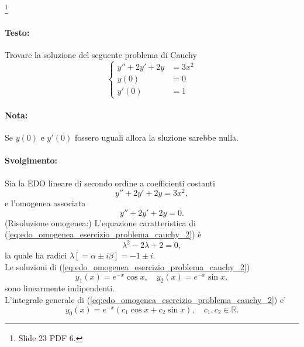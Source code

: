 \begin{example}\footnote{Slide 23 PDF 6.}
	\paragraph{Testo:} Trovare la soluzione del seguente problema di Cauchy
	\begin{equation*}
		\begin{cases}
			y'' + 2y' + 2y &= 3x^2\\
			y(0) &= 0\\
			y'(0)&=1 
		\end{cases}
	\end{equation*}
	\paragraph{Nota:} Se $y(0)$ e $y'(0)$ fossero uguali allora la sluzione sarebbe nulla.
	\paragraph{Svolgimento:} Sia la EDO lineare di secondo ordine a coefficienti costanti
	\begin{equation}\label{eq:edo_completa_esercizio_problema_cauchy_2}
		y'' + 2y' + 2y = 3x^2,
	\end{equation}
	e l'omogenea associata
	\begin{equation}\label{eq:edo_omogenea_esercizio_problema_cauchy_2}
		y'' + 2y' + 2y = 0.
	\end{equation}
	(Risoluzione omogenea:) L'equazione caratteristica di (\ref{eq:edo_omogenea_esercizio_problema_cauchy_2}) è
	\begin{equation*}
		\lambda^2 - 2\lambda + 2 = 0,
	\end{equation*}
	la quale ha radici $\lambda[= \alpha \pm i\beta] = -1 \pm i$.\\
	Le soluzioni di (\ref{eq:edo_omogenea_esercizio_problema_cauchy_2})
	\begin{equation*}
		y_1(x) = e^{-x}\cos x,\quad y_2(x) = e^{-x}\sin x,
	\end{equation*}
	sono linearmente indipendenti.\\
	L'integrale generale di (\ref{eq:edo_omogenea_esercizio_problema_cauchy_2}) e'
	\begin{equation*}
		y_0(x)=e^{-x}(c_1\cos x + c_2\sin x),\quad c_1,c_2\in\mathbb{R}.
	\end{equation*}

\end{example}
